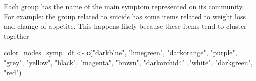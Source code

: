 \documentclass[
]{article}
\newenvironment{Shaded}{\begin{snugshade}}{\end{snugshade}}
\newcommand{\FunctionTok}[1]{\textcolor[rgb]{0.13,0.29,0.53}{\textbf{#1}}}
\newcommand{\NormalTok}[1]{#1}
\newcommand{\OtherTok}[1]{\textcolor[rgb]{0.56,0.35,0.01}{#1}}
\newcommand{\StringTok}[1]{\textcolor[rgb]{0.31,0.60,0.02}{#1}}
\begin{document}
Each group has the name of the main symptom represented on its
community. For example: the group related to suicide has some items
related to weight loss and change of appetite. This happens likely
because these items tend to cluster together

\begin{Shaded}
\begin{Highlighting}[]
\NormalTok{color\_nodes\_symp\_df }\OtherTok{\textless{}{-}} \FunctionTok{c}\NormalTok{(}\StringTok{"darkblue"}\NormalTok{, }\StringTok{"limegreen"}\NormalTok{, }\StringTok{"darkorange"}\NormalTok{, }\StringTok{"purple"}\NormalTok{, }\StringTok{"grey"}\NormalTok{, }\StringTok{"yellow"}\NormalTok{, }\StringTok{"black"}\NormalTok{, }\StringTok{"magenta"}\NormalTok{, }\StringTok{"brown"}\NormalTok{, }\StringTok{"darkorchid4"}\NormalTok{ ,}\StringTok{"white"}\NormalTok{, }\StringTok{"darkgreen"}\NormalTok{, }\StringTok{"red"}\NormalTok{)}



\end{Highlighting}
\end{Shaded}
\end{document}
